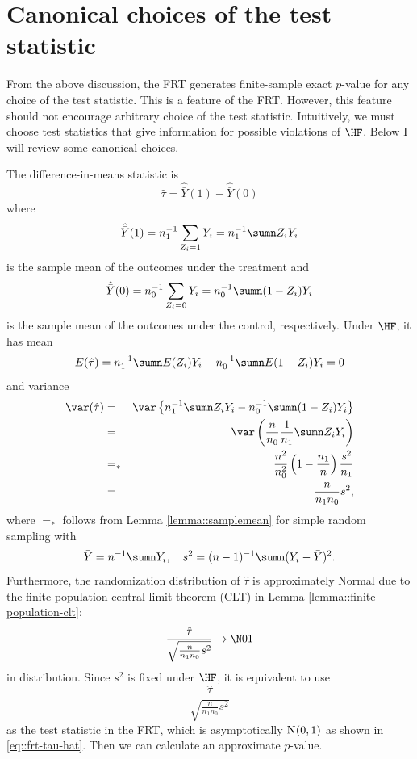 \section{Canonical choices of the test statistic}
\label{sec::frt-choiceofstatistic}

From the above discussion, the FRT generates finite-sample exact $p$-value for any choice of the test statistic. This is a feature of the FRT. However, this feature should not encourage arbitrary choice of the test statistic. Intuitively, we must choose test statistics that give information for possible violations of $\HF$.  Below I will review some canonical choices. 


\begin{example}\label{eq::frt-difference-in-means}
The difference-in-means statistic is
$$
\hat{\tau}   = \hat{\bar{Y}}(1) - \hat{\bar{Y}}(0)
$$
where
$$
 \hat{\bar{Y}}(1)  =  n_1^{-1} \sum_{Z_i=1} Y_i  = n_1^{-1} \sumn Z_iY_i 
$$
is the sample mean of the outcomes under the treatment and
$$
\hat{\bar{Y}}(0) = n_0^{-1}  \sum_{Z_i=0} Y_i   = n_0^{-1}  \sumn (1-Z_i) Y_i 
$$
is the sample mean of the outcomes under the control, respectively.
%
Under $\HF$, it has mean 
$$
E(  \hat{\tau}    ) = n_1^{-1}\sumn E(Z_i)Y_i  - n_0^{-1}  \sumn E(1-Z_i) Y_i  = 0
$$
and variance
\begin{eqnarray*}
\var( \hat{\tau}   ) &=& \var\left\{  n_1^{-1} \sumn Z_iY_i - n_0^{-1}  \sumn (1-Z_i) Y_i  \right\} \\
&=&\var\left(  \frac{n}{n_0}    \frac{1}{n_1} \sumn  Z_i Y_i         \right) \\
&=_*& \frac{n^2}{n_0^2} \left( 1 - \frac{n_1}{n} \right) \frac{s^2}{n_1} \\ 
&=& \frac{n}{n_1 n_0} s^2,
\end{eqnarray*}
where $=_*$ follows from Lemma  \ref{lemma::samplemean} for simple random sampling with
$$
\bar{Y} = n^{-1}  \sumn Y_i,\quad 
s^2 = (n-1)^{-1} \sumn (Y_i - \bar{Y})^2 .  
$$ 
Furthermore, the randomization distribution of $\hat{\tau}$ is approximately Normal due to the finite population central limit theorem (CLT) in Lemma \ref{lemma::finite-population-clt}: 
\begin{equation}\label{eq::frt-tau-hat}
\frac{  \hat{\tau}      }{  \sqrt{\frac{n}{n_1 n_0} s^2}    }  
\rightarrow  \N01 
\end{equation}
in distribution. Since $s^2$ is fixed under $\HF$, it is equivalent to use 
$$
\frac{  \hat{\tau}      }{  \sqrt{\frac{n}{n_1 n_0} s^2}    }  
$$
as the test statistic in the FRT, which is asymptotically $\textsc{N}(0,1)$ as shown in \eqref{eq::frt-tau-hat}. Then we can calculate an approximate $p$-value. 
\end{example}


